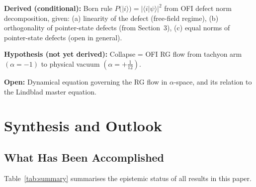 \documentclass[12pt]{article}
\theoremstyle{definition}
\begin{document}
\begin{tcolorbox}[resultbox, title={Summary of Section~\ref{sec:measurement}}]
\textbf{Derived (conditional):}
Born rule $P(|i\rangle) = |\langle i|\psi\rangle|^2$ from OFI defect
norm decomposition, given: (a) linearity of the defect (free-field
regime), (b) orthogonality of pointer-state defects (from Section~3),
(c) equal norms of pointer-state defects (open in general).

\textbf{Hypothesis (not yet derived):}
Collapse = OFI RG flow from tachyon arm $(\alpha=-1)$ to physical
vacuum $(\alpha=+\tfrac{1}{12})$.

\textbf{Open:}
Dynamical equation governing the RG flow in $\alpha$-space, and its
relation to the Lindblad master equation.
\end{tcolorbox}

\section{Synthesis and Outlook}
\label{sec:synthesis}

\subsection{What Has Been Accomplished}

Table~\ref{tab:summary} summarises the epistemic status of all results
in this paper.
\end{document}
